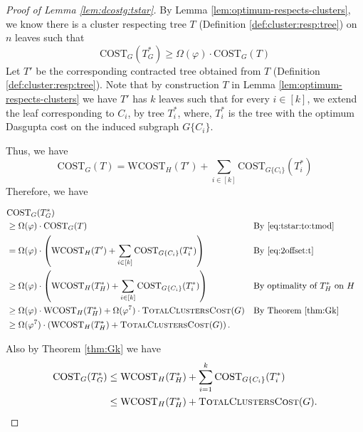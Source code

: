 \documentclass[letterpaper,11pt]{article}
\newcommand{\CT}{\text{COST}}
\newcommand{\wCT}{\text{WCOST}}
\theoremstyle{plain}
\theoremstyle{definition}
\theoremstyle{remark}
\begin{document}
\begin{proof}[Proof of Lemma \ref{lem:dcostg:tstar}] By Lemma \ref{lem:optimum-respects-clusters}, we know there is a cluster respecting tree $T$ (Definition \ref{def:cluster:resp:tree}) on $n$ leaves such that
	\begin{equation} \label{eq:tstar:to:tmod}
		\CT_G(T^*_G) \geq \Omega(\varphi) \cdot \CT_G(T)
	\end{equation}
Let  $T'$  be the corresponding contracted tree obtained from $T$ (Definition \ref{def:cluster:resp:tree}). Note that by construction  $T$ in Lemma \ref{lem:optimum-respects-clusters} we have $T'$ has $k$ leaves such that for every $i\in [k]$, we extend the leaf corresponding to $C_i$, by tree $T^*_i$, where, $T^*_i$ is the tree with the optimum Dasgupta cost on the induced subgraph $G\{C_i\}$. 

 
Thus, we have
\begin{equation} \label{eq:2offset:t}
	\CT_G(T) = \wCT_H(T') + \sum_{i\in[k]} \CT_{G\{C_i\}}(T^*_i)
	\end{equation}
Therefore, we have

\begin{align}
\label{eq:lw-jam}
&\CT_G(T^*_G) \nonumber \\
&\geq \Omega(\varphi) \cdot \CT_G(T) &&\text{By \eqref{eq:tstar:to:tmod}}  \nonumber \\
&= \Omega(\varphi) \cdot \left( \wCT_H(T') + \sum_{i\in[k]} \CT_{G\{C_i\}}(T^*_i) \right) &&\text{By \eqref{eq:2offset:t}} \nonumber \\
&\geq \Omega(\varphi) \cdot \left( \wCT_H(T^*_H) + \sum_{i\in[k]} \CT_{G\{C_i\}}(T^*_i) \right) &&\text{By optimality of  $T^*_H$ on $H$}  \nonumber \\
&\geq \Omega(\varphi) \cdot \wCT_H(T^*_H) + \Omega(\varphi^7)\cdot \textsc{TotalClustersCost}(G) &&\text{By Theorem \ref{thm:Gk}} \nonumber \\
&\geq \Omega(\varphi^7) \cdot \left( \wCT_H(T^*_H) +  \textsc{TotalClustersCost}(G) \right). 
\end{align}


Also by Theorem \ref{thm:Gk} we have
\begin{align}
\CT_G(T^*_G) 
&\leq \wCT_H(T^*_H) + \sum_{i=1}^k \CT_{G\{C_i\}}(T^*_i)  \nonumber \\
&\leq  \wCT_H(T^*_H) + \textsc{TotalClustersCost}(G) \text{.} \nonumber \\
\end{align}

\end{proof}
\end{document}
